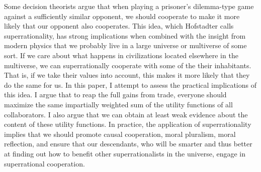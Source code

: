 Some decision theorists argue that when playing a prisoner's
dilemma-type game against a sufficiently similar opponent, we should
cooperate to make it more likely that our opponent also cooperates. This
idea, which Hofstadter calls superrationality, has strong implications
when combined with the insight from modern physics that we probably live in a
large universe or multiverse of some sort. If we care about what happens
in civilizations located elsewhere in the multiverse, we can
superrationally cooperate with some of the their inhabitants. That is,
if we take their values into account, this makes it more likely that
they do the same for us. In this paper, I attempt to assess the
practical implications of this idea. I argue that to reap the full gains
from trade, everyone should maximize the same impartially weighted sum
of the utility functions of all collaborators. I also argue that we can
obtain at least weak evidence about the content of these utility
functions. In practice, the application of superrationality implies that
we should promote causal cooperation, moral pluralism, moral reflection,
and ensure that our descendants, who will be smarter and thus better at
finding out how to benefit other superrationalists in the universe,
engage in superrational cooperation.

